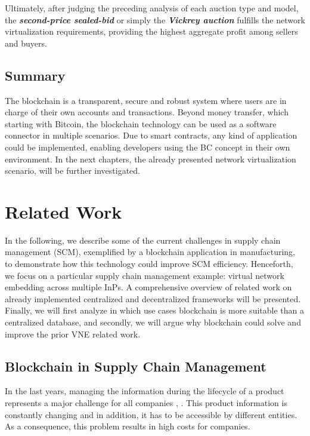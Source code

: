 Ultimately, after judging the preceding analysis of each auction type and model, the \textbf{\textit{second-price sealed-bid}} or simply the \textbf{\textit{Vickrey auction}} fulfills the network virtualization requirements, providing the highest aggregate profit among sellers and buyers.

\section{Summary}

The blockchain is a transparent, secure and robust system where users are in charge of their own accounts and transactions. Beyond money transfer, which starting with Bitcoin, the blockchain technology can be used as a software connector in multiple scenarios. Due to smart contracts, any kind of application could be implemented, enabling developers using the BC concept in their own environment. In the next chapters, the already presented network virtualization scenario, will be further investigated.

\chapter{Related Work}
\label{ch:relatedwork}

In the following, we describe some of the current challenges in supply chain management (SCM), exemplified by a blockchain application in manufacturing, to demonstrate how this technology could improve SCM efficiency. Henceforth, we focus on a particular supply chain management example: virtual network embedding across multiple InPs. A comprehensive overview of related work on already implemented centralized and decentralized frameworks will be presented. Finally, we will first analyze in which use cases blockchain is more suitable than a centralized database, and secondly, we will argue why blockchain could solve and improve the prior VNE related work.

\section{Blockchain in Supply Chain Management}

In the last years, managing the information during the lifecycle of a product represents a major challenge for all companies \citep{karkkainen2003product}, \citep{tuttle2002you}. This product information is constantly changing and in addition, it has to be accessible by different entities. As a consequence, this problem results in high costs for companies. 

